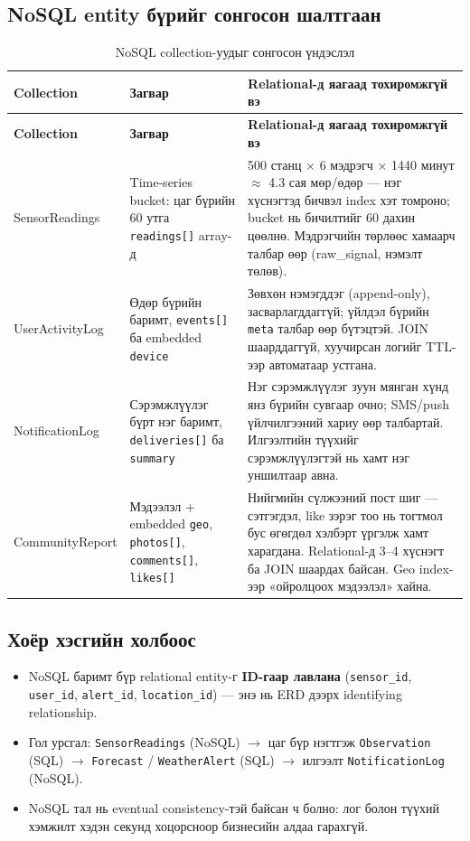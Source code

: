 \documentclass[12pt,a4paper]{article}
\begin{document}
\subsection{NoSQL entity бүрийг сонгосон шалтгаан}
{\small
\begin{longtable}{L{2.8cm}L{4.2cm}L{8.0cm}}
\caption{NoSQL collection-уудыг сонгосон үндэслэл}\label{tab:why}\\
\toprule
\textbf{Collection} & \textbf{Загвар} & \textbf{Relational-д яагаад тохиромжгүй вэ}\\
\midrule
\endfirsthead
\toprule
\textbf{Collection} & \textbf{Загвар} & \textbf{Relational-д яагаад тохиромжгүй вэ}\\
\midrule
\endhead
\bottomrule
\endfoot
SensorReadings & Time-series bucket: цаг бүрийн 60 утга \texttt{readings[]} array-д & 500 станц × 6 мэдрэгч × 1440 минут $\approx$ 4.3 сая мөр/өдөр — нэг хүснэгтэд бичвэл index хэт томроно; bucket нь бичилтийг 60 дахин цөөлнө. Мэдрэгчийн төрлөөс хамаарч талбар өөр (raw\_signal, нэмэлт төлөв).\\
UserActivityLog & Өдөр бүрийн баримт, \texttt{events[]} ба embedded \texttt{device} & Зөвхөн нэмэгддэг (append-only), засварлагддаггүй; үйлдэл бүрийн \texttt{meta} талбар өөр бүтэцтэй. JOIN шаарддаггүй, хуучирсан логийг TTL-ээр автоматаар устгана.\\
NotificationLog & Сэрэмжлүүлэг бүрт нэг баримт, \texttt{deliveries[]} ба \texttt{summary} & Нэг сэрэмжлүүлэг зуун мянган хүнд янз бүрийн сувгаар очно; SMS/push үйлчилгээний хариу өөр талбартай. Илгээлтийн түүхийг сэрэмжлүүлэгтэй нь хамт нэг уншилтаар авна.\\
CommunityReport & Мэдээлэл + embedded \texttt{geo}, \texttt{photos[]}, \texttt{comments[]}, \texttt{likes[]} & Нийгмийн сүлжээний пост шиг — сэтгэгдэл, like зэрэг тоо нь тогтмол бус өгөгдөл хэлбэрт үргэлж хамт харагдана. Relational-д 3–4 хүснэгт ба JOIN шаардах байсан. Geo index-ээр «ойролцоох мэдээлэл» хайна.\\
\end{longtable}
}

\subsection{Хоёр хэсгийн холбоос}
\begin{itemize}
  \item NoSQL баримт бүр relational entity-г \textbf{ID-гаар лавлана} (\texttt{sensor\_id}, \texttt{user\_id}, \texttt{alert\_id}, \texttt{location\_id}) — энэ нь ERD дээрх identifying relationship.
  \item Гол урсгал: \texttt{SensorReadings} (NoSQL) $\rightarrow$ цаг бүр нэгтгэж \texttt{Observation} (SQL) $\rightarrow$ \texttt{Forecast} / \texttt{WeatherAlert} (SQL) $\rightarrow$ илгээлт \texttt{NotificationLog} (NoSQL).
  \item NoSQL тал нь eventual consistency-тэй байсан ч болно: лог болон түүхий хэмжилт хэдэн секунд хоцорсноор бизнесийн алдаа гарахгүй.
\end{itemize}
\end{document}
